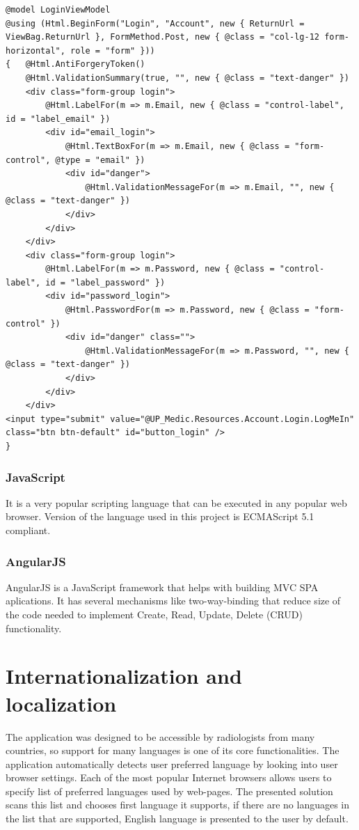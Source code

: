 \documentclass[12pt, twoside, openany]{report}
\theoremstyle{definition}
\begin{document}
\begin{lstlisting}[style=html,caption=Razor view code filled with C\# embeddings that is later converted to pure HTML code with properly translated strings\label{register-view}]
@model LoginViewModel
@using (Html.BeginForm("Login", "Account", new { ReturnUrl = ViewBag.ReturnUrl }, FormMethod.Post, new { @class = "col-lg-12 form-horizontal", role = "form" }))
{   @Html.AntiForgeryToken()
	@Html.ValidationSummary(true, "", new { @class = "text-danger" })
	<div class="form-group login">
		@Html.LabelFor(m => m.Email, new { @class = "control-label", id = "label_email" })
		<div id="email_login">
			@Html.TextBoxFor(m => m.Email, new { @class = "form-control", @type = "email" })
			<div id="danger">
				@Html.ValidationMessageFor(m => m.Email, "", new { @class = "text-danger" })
			</div>
		</div>
	</div>
	<div class="form-group login">
		@Html.LabelFor(m => m.Password, new { @class = "control-label", id = "label_password" })
		<div id="password_login">
			@Html.PasswordFor(m => m.Password, new { @class = "form-control" })
			<div id="danger" class="">
				@Html.ValidationMessageFor(m => m.Password, "", new { @class = "text-danger" })
			</div>
		</div>
    </div>
<input type="submit" value="@UP_Medic.Resources.Account.Login.LogMeIn" class="btn btn-default" id="button_login" />
}
\end{lstlisting}

\subsubsection{JavaScript}
It is a very popular scripting language that can be executed in any popular web browser. Version of the language used in this project is ECMAScript 5.1 compliant. 

\subsubsection{AngularJS}
AngularJS is a JavaScript framework that helps with building MVC SPA aplications. It has several mechanisms like two-way-binding that reduce size of the code needed to implement Create, Read, Update, Delete (CRUD) functionality.

\section{Internationalization and localization}
The application was designed to be accessible by radiologists from many countries, so support for many languages is one of its core functionalities. The application automatically detects user preferred language by looking into user browser settings. Each of the most popular Internet browsers allows users to specify list of preferred languages used by web-pages. The presented solution scans this list and chooses first language it supports, if there are no languages in the list that are supported, English language is presented to the user by default.
\end{document}
